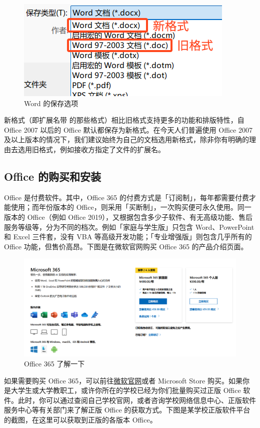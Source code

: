\begin{figure}[htb!]
  \centering
  \includegraphics[width=.6\textwidth]{assets/software/Word_formats.png}
  \caption{Word 的保存选项}
  \label{fig:Word_formats}
\end{figure}

新格式（即扩展名带  的那些格式）相比旧格式支持更多的功能和排版特性，自 Office 2007 以后的 Office 默认都保存为新格式。在今天人们普遍使用 Office 2007 及以上版本的情况下，我们建议始终为自己的文档选用新格式，除非你有明确的理由去选用旧格式，例如接收方指定了文件的扩展名。

\subsection{Office 的购买和安装}

Office 是付费软件。其中，Office 365 的付费方式是「订阅制」，每年都需要付费才能使用；而年份版本的 Office，则采用「买断制」，一次购买便可永久使用。同一版本的 Office（例如 Office 2019），又根据包含多少子软件、有无高级功能、售后服务等级等，分为不同的档次。例如「家庭与学生版」只包含 Word、PowerPoint 和 Excel 三件套，没有 VBA 等高级开发功能；「专业增强版」则包含几乎所有的 Office 功能，但售价高昂。下图是在微软官网购买 Office 365 的产品介绍页面。

\begin{figure}[htb!]
  \centering
  \includegraphics[width=.8\textwidth]{assets/software/Buying_Office_365.png}
  \caption{Office 365 了解一下}
  \label{fig:Buying_Office_365}
\end{figure}

如果需要购买 Office 365，可以前往\href{https://www.microsoft.com/zh-CN/microsoft-365/buy/microsoft-365}{微软官网}或者 Microsoft Store 购买。如果你是大学生或大学教职工，或许你所在的学校已经为你们批量购买过正版 Office 软件。此时，你可以通过查阅自己学校官网，或者咨询学校网络信息中心、正版软件服务中心等有关部门来了解正版 Office 的获取方式。下图是某学校正版软件平台的截图，在这里可以获取到正版的各版本 Office。

